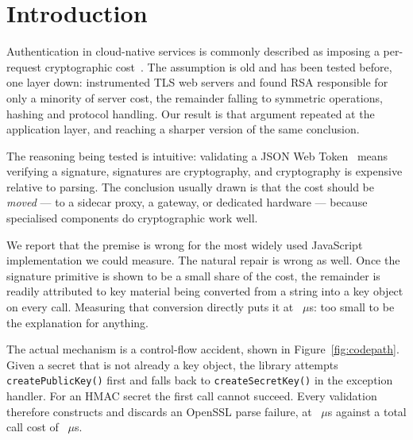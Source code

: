 \documentclass[pdflatex,sn-basic,twocolumn]{sn-jnl}%
\begin{document}

\maketitle

\section{Introduction}\label{sec:intro}

Authentication in cloud-native services is commonly described as imposing a
per-request cryptographic cost~\citep{zhu2023dissecting}.
The assumption is old and has been tested before, one layer down: \citet{coarfa2006performance} instrumented TLS web servers and found RSA
responsible for only a minority of server cost, the remainder falling to
symmetric operations, hashing and protocol handling. Our result is that
argument repeated at the application layer, and reaching a sharper version of
the same conclusion.

The reasoning being tested is intuitive: validating a JSON Web
Token~\citep{rfc7519} means verifying a signature, signatures are cryptography,
and cryptography is expensive relative to parsing. The conclusion usually drawn
is that the cost should be \emph{moved} --- to a sidecar proxy, a gateway, or
dedicated hardware --- because specialised components do cryptographic work
well.

We report that the premise is wrong for the most widely used JavaScript
implementation we could measure. The natural repair is wrong as well. Once the
signature primitive is shown to be a small share of the cost, the remainder is
readily attributed to key material being converted from a string into a key
object on every call. Measuring that conversion directly puts it at
\HostCreateSecretKey~$\mu$s: too small to be the explanation for anything.

The actual mechanism is a control-flow accident, shown in
Figure~\ref{fig:codepath}. Given a secret that is not already a key object, the
library attempts \texttt{createPublicKey()} first and falls back to
\texttt{createSecretKey()} in the exception handler. For an HMAC secret the
first call cannot succeed. Every validation therefore constructs and discards
an OpenSSL parse failure, at \HostProbeThrows~$\mu$s against a total call cost
of \HostJwtString~$\mu$s.
\end{document}
